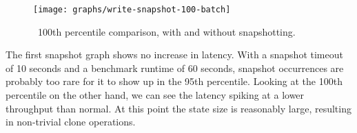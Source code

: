 \begin{figure}[H]
  \centering
  \texttt{[image: graphs/write-snapshot-100-batch]}
  \caption{\
    100th percentile comparison, with and without snapshotting.
  }\label{fig:graph-snapshot-100}
\end{figure}

The first snapshot graph shows no increase in latency. With a snapshot timeout
of 10 seconds and a benchmark runtime of 60 seconds, snapshot occurrences are
probably too rare for it to show up in the 95th percentile. Looking at the 100th
percentile on the other hand, we can see the latency spiking at a lower
throughput than normal. At this point the state size is reasonably large,
resulting in non-trivial clone operations.
